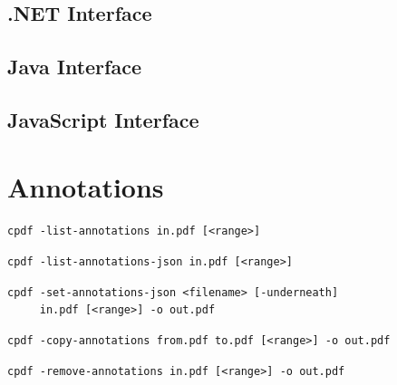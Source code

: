 \documentclass{book}
\begin{document}
\begin{dotnetcpdflib}
\clearpage
\section*{.NET Interface}
\begin{small}\tt

\end{small}
\end{dotnetcpdflib}

\begin{jcpdflib}
\clearpage
\section*{Java Interface}
\begin{small}\tt

\end{small}
\end{jcpdflib}

\begin{jscpdflib}
\clearpage
\section*{JavaScript Interface}
\begin{small}\tt

\end{small}
\end{jscpdflib}

\chapter{Annotations}\label{chap:10}
  \begin{framed}
  \small\noindent\verb!cpdf -list-annotations in.pdf [<range>]!

  \vspace{1.5mm}
  \small\noindent\verb!cpdf -list-annotations-json in.pdf [<range>]!

  \vspace{1.5mm}
  \small\noindent\verb!cpdf -set-annotations-json <filename> [-underneath]!\\
  \noindent\verb!     in.pdf [<range>] -o out.pdf!

  \vspace{1.5mm}
  \small\noindent\verb!cpdf -copy-annotations from.pdf to.pdf [<range>] -o out.pdf!

  \vspace{1.5mm}
  \small\noindent\verb!cpdf -remove-annotations in.pdf [<range>] -o out.pdf!
  \end{framed}
\end{document}
